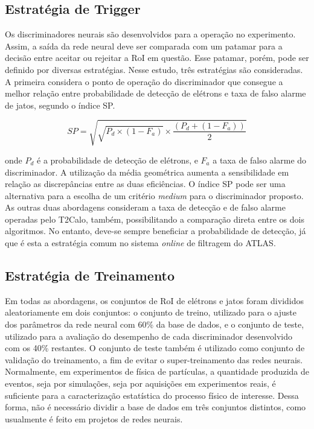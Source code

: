 
\subsection{Estratégia de Trigger}

Os discriminadores neurais são desenvolvidos para a operação no experimento. Assim, a saída da rede neural deve ser comparada com um patamar para a decisão
entre aceitar ou rejeitar a RoI em questão. Esse patamar, porém, pode ser definido por diversas estratégias. Nesse estudo, três estratégias são consideradas.
A primeira considera o ponto de operação do discriminador que consegue a melhor relação entre probabilidade de detecção de elétrons e taxa 
de falso alarme de jatos, segundo o índice SP.

\begin{equation}
SP = \sqrt{ \sqrt{P_{d} \times (1-F_{a})}  \times \frac{(P_{d}+(1-F_{a}))}{2} }
\end{equation}


onde $P_{d}$ é a probabilidade de detecção de elétrons, e $F_{a}$ a taxa de falso alarme do discriminador. A utilização da média geométrica aumenta a sensibilidade em relação as discrepâncias 
entre as duas eficiências. O índice SP pode ser uma alternativa para a escolha de um critério \textit{medium} para o discriminador proposto. As outras duas abordagens consideram a taxa de detecção 
e de falso alarme operadas pelo T2Calo, também, possibilitando a comparação direta entre os dois algoritmos. No entanto, deve-se sempre beneficiar a probabilidade de detecção, já que é esta 
a estratégia comum no sistema \textit{online} de filtragem do ATLAS.


\subsection{Estratégia de Treinamento}


Em todas as abordagens, os conjuntos de RoI de elétrons e jatos foram divididos aleatoriamente em dois conjuntos: o conjunto de treino, utilizado para o ajuste dos 
parâmetros da rede neural com 60\% da base de dados, e o conjunto de teste, utilizado para a avaliação do desempenho de cada discriminador desenvolvido com os 40\% restantes. 
O conjunto de teste também é utilizado como conjunto de validação do treinamento, a fim de evitar o super-treinamento das redes neurais. Normalmente, em experimentos de física de 
partículas, a quantidade produzida de eventos, seja por simulações, seja por aquisições em experimentos reais, é suficiente para a caracterização estatística do processo físico de interesse. 
Dessa forma, não é necessário dividir a base de dados em três conjuntos distintos, como usualmente é feito em projetos de redes neurais.

